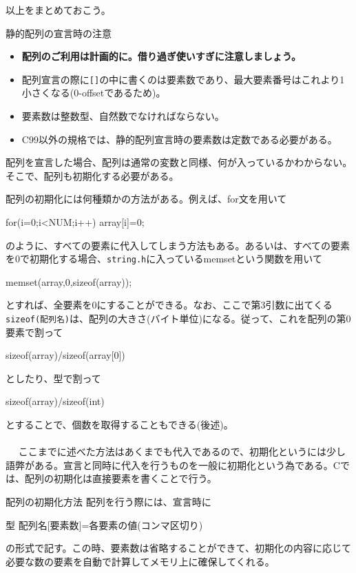 以上をまとめておこう。
\begin{itembox}[l]{静的配列の宣言時の注意}
\begin{itemize}
\item \textbf{配列のご利用は計画的に。借り過ぎ使いすぎに注意しましょう。}
\item 配列宣言の際に\verb|[]|の中に書くのは要素数であり、最大要素番号はこれより1小さくなる(0-offsetであるため)。
\item 要素数は整数型、自然数でなければならない。
\item C99以外の規格では、静的配列宣言時の要素数は定数である必要がある。
\end{itemize}
\end{itembox}

配列を宣言した場合、配列は通常の変数と同様、何が入っているかわからない。そこで、配列も初期化する必要がある。

配列の初期化には何種類かの方法がある。例えば、for文を用いて
\begin{code}
for(i=0;i<NUM;i++) array[i]=0;
\end{code}
のように、すべての要素に代入してしまう方法もある。あるいは、すべての要素を0で初期化する場合、\verb|string.h|に入っているmemsetという関数を用いて
\begin{code}
memset(array,0,sizeof(array));
\end{code}
とすれば、全要素を0にすることができる。なお、ここで第3引数に出てくる\verb|sizeof(配列名)|は、配列の大きさ(バイト単位)になる。従って、これを配列の第0要素で割って
\begin{code}
sizeof(array)/sizeof(array[0])
\end{code}
としたり、型で割って
\begin{code}
sizeof(array)/sizeof(int)
\end{code}
とすることで、個数を取得することもできる(後述)。
\\ \\　
ここまでに述べた方法はあくまでも代入であるので、初期化というには少し語弊がある。宣言と同時に代入を行うものを一般に初期化という為である。Cでは、配列の初期化は直接要素を書くことで行う。
\begin{itembox}[l]{配列の初期化方法}
配列を行う際には、宣言時に
\begin{code}
型 配列名[要素数]={各要素の値(コンマ区切り)}
\end{code}
の形式で記す。この時、要素数は省略することができて、初期化の内容に応じて必要な数の要素を自動で計算してメモリ上に確保してくれる。
\end{itembox}


